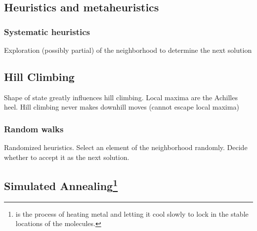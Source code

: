 \subsection{Heuristics and metaheuristics}

\begin{Parallel}[v]{0.48\textwidth}{0.48\textwidth}
\ParallelPar
\end{Parallel}

\subsubsection{Systematic heuristics}
Exploration (possibly partial) of the neighborhood to determine the next solution

\subsection{Hill Climbing}
Shape of state greatly influences hill climbing. Local maxima are the Achilles heel. Hill climbing never makes downhill moves (cannot escape local maxima)

\subsubsection{Random walks}
Randomized heuristics. Select an element of the neighborhood randomly. Decide whether to accept it as the next solution.

\subsection[Simulated Annealing]{Simulated Annealing\footnote{ is the process of heating metal and letting it cool slowly to lock in the stable locations of the molecules.}}

